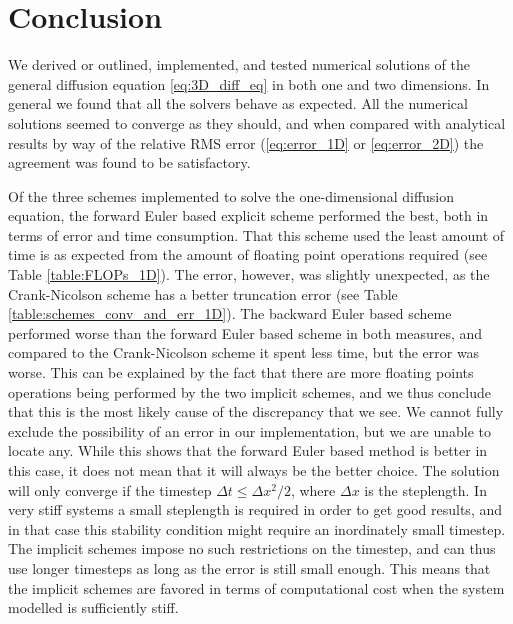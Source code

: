 \documentclass[reprint,english,notitlepage]{revtex4-1}  %
\begin{document}
\clearpage




\section{Conclusion} \label{sec:conclusion}

We derived or outlined, implemented, and tested numerical solutions of the general diffusion equation \eqref{eq:3D_diff_eq} in both one and two dimensions. In general we found that all the solvers behave as expected. All the numerical solutions seemed to converge as they should, and when compared with analytical results by way of the relative RMS error (\eqref{eq:error_1D} or \eqref{eq:error_2D}) the agreement was found to be satisfactory. 

Of the three schemes implemented to solve the one-dimensional diffusion equation, the forward Euler based explicit scheme performed the best, both in terms of error and time consumption. That this scheme used the least amount of time is as expected from the amount of floating point operations required (see Table \ref{table:FLOPs_1D}). The error, however, was slightly unexpected, as the Crank-Nicolson scheme has a better truncation error (see Table \ref{table:schemes_conv_and_err_1D}). The backward Euler based scheme performed worse than the forward Euler based scheme in both measures, and compared to the Crank-Nicolson scheme it spent less time, but the error was worse. This can be explained by the fact that there are more floating points operations being performed by the two implicit schemes, and we thus conclude that this is the most likely cause of the discrepancy that we see. We cannot fully exclude the possibility of an error in our implementation, but we are unable to locate any. While this shows that the forward Euler based method is better in this case, it does not mean that it will always be the better choice. The solution will only converge if the timestep $\Delta t \leq \Delta x^{2}/2$, where $\Delta x$ is the steplength. In very stiff systems a small steplength is required in order to get good results, and in that case this stability condition might require an inordinately small timestep. The implicit schemes impose no such restrictions on the timestep, and can thus use longer timesteps as long as the error is still small enough. This means that the implicit schemes are favored in terms of computational cost when the system modelled is sufficiently stiff. 
\end{document}
